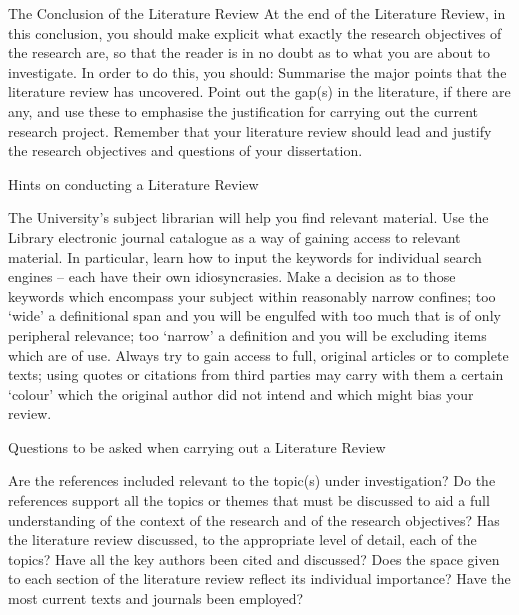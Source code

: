 			The Conclusion of the Literature Review
			At the end of the Literature Review, in this conclusion, you should make explicit what exactly the research objectives of the research are, so that the reader is in no doubt as to what you are about to investigate.
			In order to do this, you should:
			Summarise the major points that the literature review has uncovered.
			Point out the gap(s) in the literature, if there are any, and use these to emphasise the justification for carrying out the current research project.
			Remember  that  your  literature  review  should  lead  and  justify  the research objectives and questions of your dissertation.
			
			Hints on conducting a Literature Review
			
			
			
			The University’s subject librarian will help you find relevant material.
			Use the Library electronic journal catalogue as a way of gaining access to relevant material. In particular, learn how to input the keywords for individual search engines – each have their own idiosyncrasies.
			Make a decision as to those keywords which encompass your subject within reasonably narrow confines; too ‘wide’ a definitional span and you will be engulfed with too much that is of only peripheral relevance; too ‘narrow’ a definition and you will be excluding items which are of use.
			Always try to gain access to full, original articles or to complete texts; using quotes or citations from third parties may carry with them a certain ‘colour’ which the original author did not intend and which might bias your review.
			
			Questions to be asked when carrying out a Literature Review
			
			Are the references included relevant to the topic(s) under investigation?
			Do the references support all the topics or themes that must be discussed to aid a full understanding of the context of the research and  of  the research objectives?
			Has the literature review discussed, to the appropriate level of detail, each of the topics?
			Have all the key authors been cited and discussed?
			Does the space given to each section of the literature review reflect its individual importance?
			Have the most current texts and journals been employed?
			
			
			
	
	
	
	
	
	
	
	
	
	
